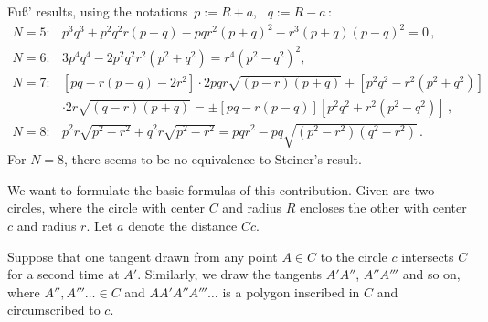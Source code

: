 Fuß' results, using the notations \,$p:= R+a$, \ $q:= R-a\,$:
\[ \begin{array}{ll}
  N=5: &p^3q^3 + p^2q^2r(p+q) - pqr^2(p+q)^2 - r^3(p+q)(p-q)^2 = 0\,,
 \\[1.5mm]
  N=6: &3p^4q^4 - 2p^2q^2r^2(p^2+q^2) = r^4(p^2-q^2)^2,
 \\[1.5mm]
  N=7: &[pq - r(p-q) -2r^2]\cdot 2pqr\sqrt{(p-r)(p+q)}
        +[p^2q^2 - r^2(p^2+q^2)]
       \\[0.5mm]
       &\cdot 2r\sqrt{(q-r)(p+q)} = \pm[pq - r(p-q)][p^2q^2 + r^2(p^2-q^2)]\,, 
 \\[1.5mm]
  N=8: &p^2r\sqrt{p^2-r^2} + q^2r\sqrt{p^2-r^2} = pqr^2 - pq\sqrt{(p^2-r^2)(q^2-r^2)}\,.
 \end{array}
\]      
For $N=8$, there seems to be no equivalence to Steiner's result.
\goodbreak
\bigskip{}

\medskip\noindent
We want to formulate the basic formulas of this contribution.
Given are two circles, where the circle with center $C$ and radius $R$ encloses the other with center $c$ and radius $r$.
Let $a$ denote the distance $Cc$.

Suppose that one tangent drawn from any point $A\in C$ to the circle $c$ intersects $C$ for a second time at $A'$.
Similarly, we draw the tangents $A'A''$, $A''A'''$ and so on, where $A'',A'''\dots\in C$ and $AA'A''A'''\dots$ is a polygon inscribed in $C$ and circumscribed to $c$.

